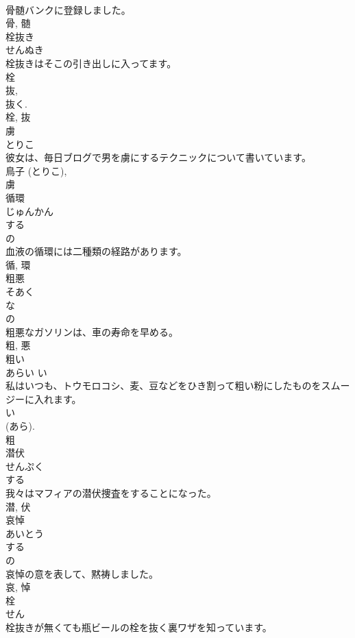 \documentclass[8pt]{extreport}
\begin{document}
\begin{CJK}{UTF8}{min}
\\	骨髄バンクに登録しました。	
\\	骨, 髄	
\\	栓抜き	
\\	せんぬき	
\\	栓抜きはそこの引き出しに入ってます。	
\\	栓 
\\	抜, 
\\	抜く. 
\\	栓, 抜	
\\	虜	
\\	とりこ	
\\	彼女は、毎日ブログで男を虜にするテクニックについて書いています。	
\\	鳥子 (とりこ), 
\\	虜	
\\	循環	
\\	じゅんかん	
\\	する 
\\	の 
\\	血液の循環には二種類の経路があります。	
\\	循, 環	
\\	粗悪	
\\	そあく	
\\	な 
\\	の 
\\	粗悪なガソリンは、車の寿命を早める。	
\\	粗, 悪	
\\	粗い	
\\	あらい	い 
\\	私はいつも、トウモロコシ、麦、豆などをひき割って粗い粉にしたものをスムージーに入れます。	
\\	い 
\\	(あら). 
\\	粗	
\\	潜伏	
\\	せんぷく	
\\	する 
\\	我々はマフィアの潜伏捜査をすることになった。	
\\	潜, 伏	
\\	哀悼	
\\	あいとう	
\\	する 
\\	の 
\\	哀悼の意を表して、黙祷しました。	
\\	哀, 悼	
\\	栓	
\\	せん	
\\	栓抜きが無くても瓶ビールの栓を抜く裏ワザを知っています。	

\end{CJK}
\end{document}
